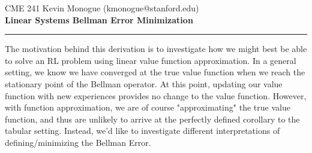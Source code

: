 \documentclass{article}
\makeatletter
\newcommand{\MyName}{Kevin Monogue (kmonogue@stanford.edu)}
\newcommand{\PrintFirstHeader}{
  CME 241 \vspace{5pt} \hfill {\Large{\MyName}}
  \\
  {\LARGE{\textbf{Linear Systems Bellman Error Minimization}}} 

  \rule{\textwidth}{0.4pt}}
\makeatother
\begin{document}
\thispagestyle{firstpage}
\PrintFirstHeader{}

The motivation behind this derivation is to investigate how we might best be able to solve an RL problem using linear value function approximation. In a general setting, we know we have converged at the true value function when we reach the stationary point of the Bellman operator. At this point, updating our value function with new experiences provides no change to the value function. However, with function approximation, we are of course "approximating" the true value function, and thus are unlikely to arrive at the perfectly defined corollary to the tabular setting. Instead, we'd like to investigate different interpretations of defining/minimizing the Bellman Error. \\
\end{document}
